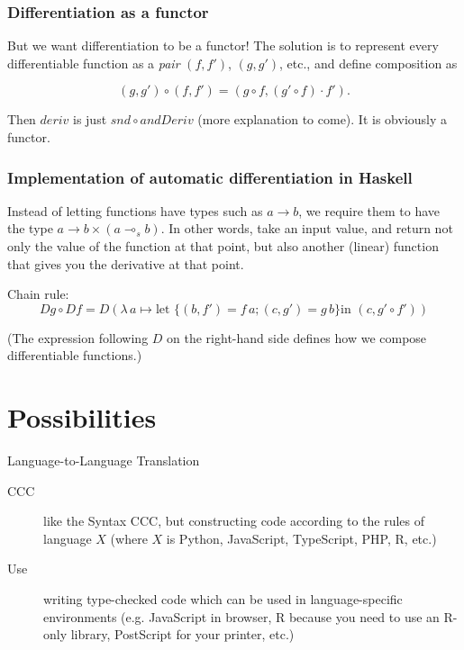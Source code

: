 \documentclass[10pt]{beamer}
\newcommand{\lamf}[2]{\ensuremath{\lambda\, #1 \mapsto #2}}
\theoremstyle{definition}
\theoremstyle{remark}
\numberwithin{equation}{section}
\begin{document}
\begin{frame}[fragile]
  \frametitle{Differentiation as a functor}

  But we want differentiation to be a functor! The solution is to represent
  every differentiable function as a \emph{pair} $(f,f')$, $(g,g')$, etc., and
  define composition as

  \[
    (g,g') \circ (f,f') = (g \circ f, (g' \circ f) \cdot f').
  \]

  Then $deriv$ is just $snd \circ andDeriv$ (more explanation to come). It is
  obviously a functor.
  
\end{frame}

\begin{frame}[fragile]
  \frametitle{Implementation of automatic differentiation in Haskell}

  Instead of letting functions have types such as $a \rightarrow b$, we require them to
  have the type $a \rightarrow b \times (a \multimap_s b)$. In other words, take an input
  value, and return not only the value of the function at that point, but also
  another (linear) function that gives you the derivative at that point.

  Chain rule:
  \[
    Dg \circ Df = D (\lamf{a}{\text{let } \{(b, f') = f\,a; (c,g') = g\,b\} \text{
        in }
    (c, g' \circ f')})
\]

(The expression following $D$ on the right-hand side defines how we
compose differentiable functions.)
\end{frame}

\section{Possibilities} %

\begin{frame}[fragile]{Language-to-Language Translation}
  \begin{description}
  \item[CCC] like the Syntax CCC, but constructing code according to the rules of language $X$ (where $X$ is Python, JavaScript, TypeScript, PHP, R, etc.)
  \item[Use] writing type-checked code which can be used in language-specific environments (e.g. JavaScript in browser, R because you need to use an R-only library, PostScript for your printer, etc.)
  \end{description}
\end{frame}
\end{document}
